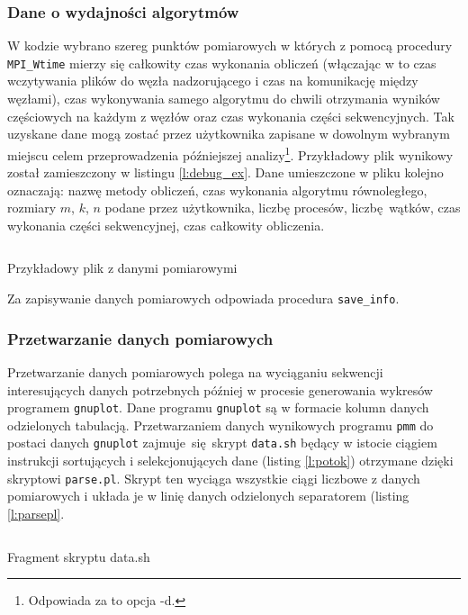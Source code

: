 \subsubsection{Dane o wydajności algorytmów}
W kodzie wybrano szereg punktów pomiarowych w których z pomocą procedury \texttt{MPI\_Wtime} mierzy się całkowity czas wykonania obliczeń (włączając w to czas wczytywania plików do węzła nadzorującego i czas na komunikację między węzłami), czas wykonywania samego algorytmu do chwili otrzymania wyników częściowych na każdym z węzłów oraz czas wykonania części sekwencyjnych. Tak uzyskane dane mogą zostać przez użytkownika zapisane w dowolnym wybranym miejscu celem przeprowadzenia późniejszej analizy\footnote{Odpowiada za to opcja -d.}. Przykładowy plik wynikowy został zamieszczony w listingu \ref{l:debug_ex}. Dane umieszczone w pliku kolejno oznaczają: nazwę metody obliczeń, czas wykonania algorytmu równoległego, rozmiary \(m\), \(k\), \(n\) podane przez użytkownika, liczbę procesów, liczbę wątków, czas wykonania części sekwencyjnej, czas całkowity obliczenia.

\begin{listing}
\inputminted[fontsize=\footnotesize,bgcolor=bg,breaklines]{c}{includes/listings/debug_1441565169}
\caption{Przykładowy plik z danymi pomiarowymi}
\label{l:debug_ex}
\end{listing}

\noindent Za zapisywanie danych pomiarowych odpowiada procedura \texttt{save\_info}.

\subsubsection{Przetwarzanie danych pomiarowych}
Przetwarzanie danych pomiarowych polega na wyciąganiu sekwencji interesujących danych potrzebnych później w procesie generowania wykresów programem \texttt{gnuplot}. Dane programu \texttt{gnuplot} są w formacie kolumn danych odzielonych tabulacją. Przetwarzaniem danych wynikowych programu \texttt{pmm} do postaci danych \texttt{gnuplot} zajmuje się skrypt \texttt{data.sh} będący w istocie ciągiem instrukcji sortujących i selekcjonujących dane (listing \ref{l:potok}) otrzymane dzięki skryptowi \texttt{parse.pl}. Skrypt ten wyciąga wszystkie ciągi liczbowe z danych pomiarowych i układa je w linię danych odzielonych separatorem (listing \ref{l:parsepl}.

\begin{listing}[H]
\inputminted[fontsize=\footnotesize,bgcolor=bg,linenos,firstnumber=4,firstline=4,lastline=9,breaklines]{bash}{includes/listings/data.sh}
\caption{Fragment skryptu data.sh}
\label{l:collecting_cannon}
\end{listing}

